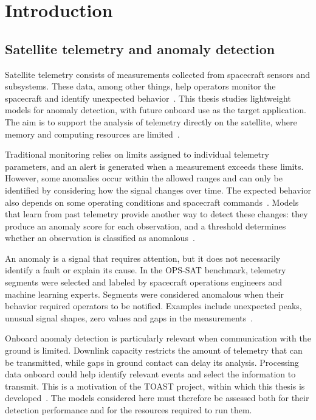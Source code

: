 \chapter{Introduction}
\label{chap:introduction}


\section{Satellite telemetry and anomaly detection}
\label{sec:introduction-telemetry}

Satellite telemetry consists of measurements collected from spacecraft sensors
and subsystems. These data, among other things, help operators monitor the spacecraft and identify
unexpected behavior~\cite{Hundman2018Spacecraft}. This thesis studies lightweight
models for anomaly detection, with future onboard use as the target application.
The aim is to support the analysis of telemetry directly on the satellite,
where memory and computing resources are limited~\cite{TOASTExecutiveSummary}.

Traditional monitoring relies on limits assigned to individual telemetry
parameters, and an alert is generated when a measurement exceeds these limits.
However, some anomalies occur within the allowed ranges and can only be
identified by considering how the signal changes over time. The expected behavior
also depends on some operating conditions and spacecraft
commands~\cite{Hundman2018Spacecraft}. Models that learn from past telemetry
provide another way to detect these changes: they produce an anomaly score
for each observation, and a threshold determines whether an observation is
classified as anomalous~\cite{Yermakov2025TranADPlus}.

An anomaly is a signal that requires attention, but it does not necessarily
identify a fault or explain its cause. In the \ac{OPS-SAT} benchmark,
telemetry segments were selected and labeled by spacecraft operations
engineers and machine learning experts. Segments were considered anomalous
when their behavior required operators to be notified. Examples include
unexpected peaks, unusual signal shapes, zero values and gaps in the
measurements~\cite{Ruszczak2025OPSSAT}.

Onboard anomaly detection is particularly relevant when communication with
the ground is limited. Downlink capacity restricts the amount of telemetry
that can be transmitted, while gaps in ground contact can delay its analysis.
Processing data onboard could help identify relevant events and select the
information to transmit. This is a motivation of the \ac{TOAST} project,
within which this thesis is developed~\cite{TOASTExecutiveSummary}.
The models considered here must therefore be assessed both for their detection
performance and for the resources required to run them.

